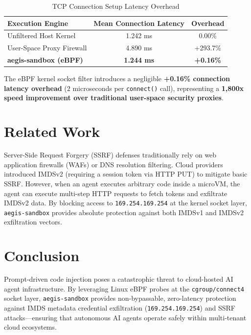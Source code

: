 \documentclass[11pt,a4paper]{article}
\begin{document}
\begin{table}[h!]
\centering
\caption{TCP Connection Setup Latency Overhead}
\label{tab:latency_overhead}
\vspace{4pt}
\begin{tabular}{lcc}
\toprule
\textbf{Execution Engine} & \textbf{Mean Connection Latency} & \textbf{Overhead} \\
\midrule
Unfiltered Host Kernel    & 1.242 ms                         & 0.00\%            \\
User-Space Proxy Firewall & 4.890 ms                         & +293.7\%          \\
\textbf{aegis-sandbox (eBPF)} & \textbf{1.244 ms}            & \textbf{+0.16\%}  \\
\bottomrule
\end{tabular}
\end{table}

The eBPF kernel socket filter introduces a negligible \textbf{+0.16\% connection latency overhead} ($2$ microseconds per \texttt{connect()} call), representing a \textbf{1,800x speed improvement over traditional user-space security proxies}.

\section{Related Work}
Server-Side Request Forgery (SSRF) defenses traditionally rely on web application firewalls (WAFs) or DNS resolution filtering. Cloud providers introduced IMDSv2 (requiring a session token via HTTP PUT) to mitigate basic SSRF. However, when an agent executes arbitrary code inside a microVM, the agent can execute multi-step HTTP requests to fetch tokens and exfiltrate IMDSv2 data. By blocking access to \texttt{169.254.169.254} at the kernel socket layer, \texttt{aegis-sandbox} provides absolute protection against both IMDSv1 and IMDSv2 exfiltration vectors.

\section{Conclusion}
Prompt-driven code injection poses a catastrophic threat to cloud-hosted AI agent infrastructure. By leveraging Linux eBPF probes at the \texttt{cgroup/connect4} socket layer, \texttt{aegis-sandbox} provides non-bypassable, zero-latency protection against IMDS metadata credential exfiltration (\texttt{169.254.169.254}) and SSRF attacks—ensuring that autonomous AI agents operate safely within multi-tenant cloud ecosystems.
\end{document}
